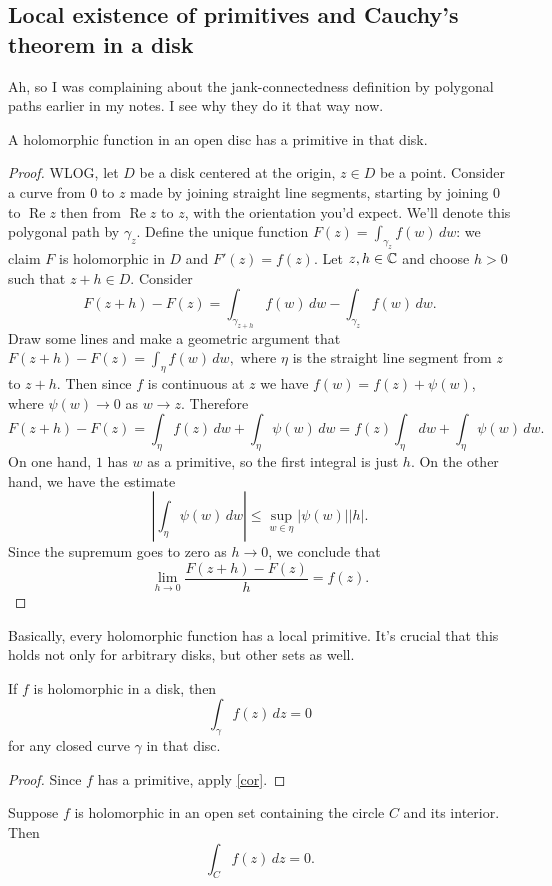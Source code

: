 \subsection{Local existence of primitives and Cauchy's theorem in a disk}
Ah, so I was complaining about the jank-connectedness definition by polygonal paths earlier in my notes. I see why they do it that way now.
\begin{theorem}
    A holomorphic function in an open disc has a primitive in that disk.
\end{theorem}
\begin{proof}
    WLOG, let $D$ be a disk centered at the origin, $z\in D$ be a point. Consider a curve from $0$ to $z$ made by joining straight line segments, starting by joining $0$ to $\operatorname{Re}z$ then from $\operatorname{Re}z$ to $z$, with the orientation you'd expect. We'll denote this polygonal path by $\gamma_z$. Define the unique function $F(z)=\int_{\gamma_z}^{} f(w) \, dw$: we claim $F$ is holomorphic in $D$ and $F'(z)=f(z)$. Let $z,h\in \mathbb{C}$ and choose $h>0$ such that $z+h\in D$. Consider \[
        F(z+h)-F(z)=\int_{\gamma_{z+h}}^{} f(w) \, dw-\int_{\gamma_z}^{} f(w) \, dw.
    \] Draw some lines and make a geometric argument that $F(z+h)-F(z)=\int_{\eta}^{} f(w) \, dw,$ where $\eta$ is the straight line segment from $z$ to $z+h$. Then since $f$ is continuous at $z$ we have $f(w)=f(z)+\psi(w)$, where $\psi(w)\to 0$ as $w\to z$. Therefore \[
    F(z+h)-F(z)=\int_{\eta}^{} f(z) \, dw + \int_{\eta}^{} \psi(w) \, dw=f(z) \int_{\eta}^{}  \, dw + \int_{\eta}^{} \psi(w) \, dw.
\] On one hand, $1$ has $w$ as a primitive, so the first integral is just $h$. On the other hand, we have the estimate \[
\left| \int_{\eta}^{} \psi(w) \, dw \right| \leq \underset{w\in \eta}{\operatorname{sup}}|\psi(w)| |h|.
\] Since the supremum goes to zero as $h\to 0$, we conclude that  \[
\lim_{h\to 0}\frac{F(z+h)-F(z)}{h}=f(z).
\] 
\end{proof}
Basically, every holomorphic function has a local primitive. It's crucial that this holds not only for arbitrary disks, but other sets as well.
\begin{theorem}
If $f$ is holomorphic in a disk, then \[
    \int_{\gamma}^{} f(z) \, dz=0
\] for any closed curve $\gamma$ in that disc.
\end{theorem}
\begin{proof}
    Since $f$ has a primitive, apply \cref{cor}.
\end{proof}
\begin{cor}
    Suppose $f$ is holomorphic in an open set containing the circle $C$ and its interior. Then \[
        \int_{C}^{} f(z) \, dz=0.
    \] 
\end{cor}
